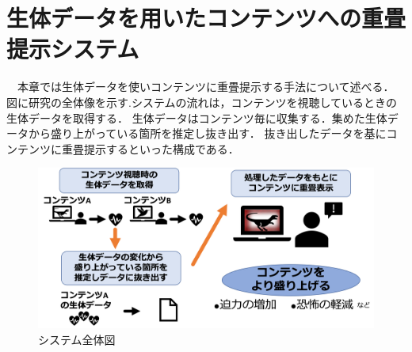 \chapter{生体データを用いたコンテンツへの重畳提示システム}

\thispagestyle{myheadings}

　本章では生体データを使いコンテンツに重畳提示する手法について述べる．
図に研究の全体像を示す.システムの流れは，コンテンツを視聴しているときの生体データを取得する．
生体データはコンテンツ毎に収集する．集めた生体データから盛り上がっている箇所を推定し抜き出す．
抜き出したデータを基にコンテンツに重畳提示するといった構成である．

\begin{figure}[H]
    \centering
    \includegraphics[width=15cm]{images/chapter3/allsysytem.png}
    \caption{システム全体図}
\end{figure}

